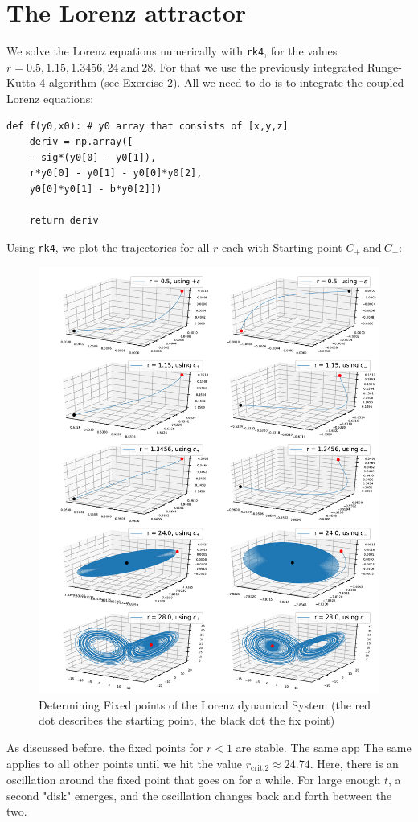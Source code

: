 \documentclass{article}
\begin{document}
\section{The Lorenz attractor}
We solve the Lorenz equations numerically with \texttt{rk4}, for the values
\( r = 0.5, 1.15, 1.3456, 24 \ \text{and} \ 28 \).
For that we use the previously integrated Runge-Kutta-4 algorithm
(see Exercise 2). All we need to do is to integrate the coupled Lorenz equations:
\begin{lstlisting}
def f(y0,x0): # y0 array that consists of [x,y,z]
    deriv = np.array([
    - sig*(y0[0] - y0[1]),
    r*y0[0] - y0[1] - y0[0]*y0[2],
    y0[0]*y0[1] - b*y0[2]])

    return deriv
\end{lstlisting}
Using \texttt{rk4}, we plot the trajectories for all \( r \) each with Starting
point \( C_+ \ \text{and} \ C_- \):
\begin{figure}[H]
    \centering
    \includegraphics[width=\textwidth]{Figure2-1.pdf} 
    \caption{Determining Fixed points of the Lorenz dynamical System
    (the red dot describes the starting point, the black dot the fix point)} 
    \label{2-1}
\end{figure}
As discussed before, the fixed points for $r < 1$ are stable. The same app The
same applies to all other points until we hit the value \( r_\text{crit,2}
    \approx 24.74\). Here, there is an oscillation around the fixed point that
goes on for a while. For large enough \( t \), a second "disk" emerges, and the
oscillation changes back and forth between the two.
\end{document}
